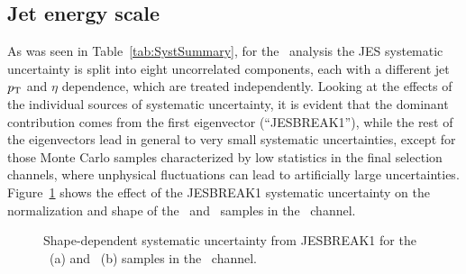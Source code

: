\subsection{Jet energy scale}\label{sec:htx_syst_jes}
As was seen in Table~\ref{tab:SystSummary}, for the \htx\ analysis
the JES systematic uncertainty is split into eight
uncorrelated components, each with a different jet $\pt$ and $\eta$
dependence, which are treated independently.
Looking at the effects of the individual sources of systematic uncertainty, 
it is evident that the dominant contribution comes from the first 
eigenvector (``JESBREAK1''), while the rest of the
eigenvectors lead in general to very small systematic uncertainties, 
except for those Monte Carlo samples characterized by low statistics
in the final selection channels, where unphysical fluctuations
can lead to artificially large uncertainties. Figure~\ref{fig:jesHTX}
shows the effect of the JESBREAK1 systematic uncertainty on the normalization
and shape of the \tthf\ and \ttlf\ samples in the \chiv\ channel.

\begin{figure}[htb]\begin{center}
	\caption{Shape-dependent systematic uncertainty from JESBREAK1 for 
        the \tthf\ (a) and \ttlf\ (b) samples in the \chiv\ channel. \label{fig:jesHTX}}
\end{center}\end{figure}



